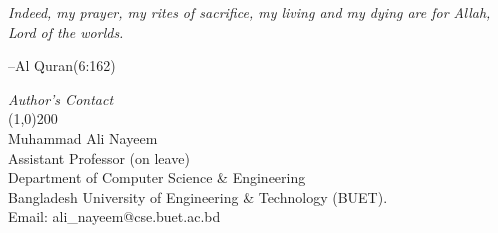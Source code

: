  \vspace{40cm}
 	 \textit{\Large Indeed, my prayer, my rites of sacrifice, my living and my dying are for Allah, Lord of the worlds.}  \begin{flushright}\Large --Al Quran(6:162)\\\end{flushright}
 \vspace{11cm}
 \begin{flushright}
 \textit{\Large \sc Author's Contact}\\
 \line(1,0){200}\\
 Muhammad Ali Nayeem\\
 Assistant Professor (on leave)\\
 Department of Computer Science \& Engineering \\
 Bangladesh University of Engineering \& Technology (BUET).\\
 Email:
 {ali\_nayeem@cse.buet.ac.bd}
 \end{flushright}
 \newpage
 \vspace*{-3.8cm}
